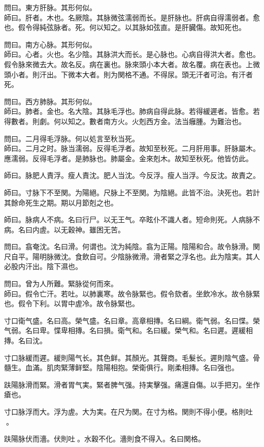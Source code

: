 問曰。東方肝脉。其形何似。\\
師曰。肝者。木也。名厥陰。其脉微弦濡弱而长。是肝脉也。肝病自得濡弱者。愈也。假令得純弦脉者。死。何以知之。以其脉如弦直。是肝臓傷。故知死也。

問曰。南方心脉。其形何似。\\
師曰。心者。火也。名少陰。其脉洪大而长。是心脉也。心病自得洪大者。愈也。假令脉來微去大。故名反。病在裏也。脉來頭小本大者。故名覆。病在表也。上微頭小者。則汗出。下微本大者。則为関格不通。不得尿。頭无汗者可治。有汗者死。

問曰。西方肺脉。其形何似。\\
師曰。肺者。金也。名大陰。其脉毛浮也。肺病自得此脉。若得緩遲者。皆愈。若得數者。則劇。何以知之。數者南方火。火剋西方金。法当癰腫。为難治也。

問曰。二月得毛浮脉。何以処言至秋当死。\\
師曰。二月之时。脉当濡弱。反得毛浮者。故知至秋死。二月肝用事。肝脉屬木。應濡弱。反得毛浮者。是肺脉也。肺屬金。金來剋木。故知至秋死。他皆仿此。

師曰。脉肥人責浮。瘦人責沈。肥人当沈。今反浮。瘦人当浮。今反沈。故責之。

師曰。寸脉下不至関。为陽絕。尺脉上不至関。为陰絕。此皆不治。決死也。若計其餘命死生之期。期以月節剋之也。

師曰。脉病人不病。名曰行尸。以无王气。卒眩仆不識人者。短命則死。人病脉不病。名曰内虗。以无穀神。雖困无苦。

問曰。翕奄沈。名曰滑。何谓也。沈为純陰。翕为正陽。陰陽和合。故令脉滑。関尺自平。陽明脉微沈。食飲自可。少陰脉微滑。滑者緊之浮名也。此为陰実。其人必股内汗出。陰下濕也。

問曰。曾为人所難。緊脉從何而來。\\
師曰。假令亡汗。若吐。以肺裏寒。故令脉緊也。假令欬者。坐飲冷水。故令脉緊也。假令下利。以胃中虗冷。故令脉緊也。

寸口衛气盛。名曰高。榮气盛。名曰章。高章相摶。名曰綱。衛气弱。名曰惵。榮气弱。名曰卑。惵卑相摶。名曰損。衛气和。名曰緩。榮气和。名曰遲。遲緩相摶。名曰沈。

寸口脉緩而遲。緩則陽气长。其色鲜。其顏光。其聲商。毛髮长。遲則陰气盛。骨髓生。血滿。肌肉緊薄鲜堅。陰陽相抱。榮衛俱行。剛柔相摶。名曰强也。

趺陽脉滑而緊。滑者胃气実。緊者脾气强。持実擊强。痛還自傷。以手把刃。坐作瘡也。

寸口脉浮而大。浮为虗。大为実。在尺为関。在寸为格。関則不得小便。格則吐{\sungtpii 𠱘}。

趺陽脉伏而濇。伏則吐{\sungtpii 𠱘}。水穀不化。濇則食不得入。名曰関格。

